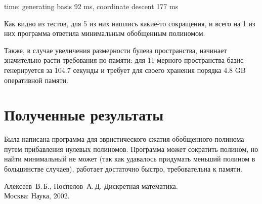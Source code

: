 \documentclass[a4paper,12pt,titlepage,finall]{article}
\begin{document}
time: generating basis 92 ms, coordinate descent 177 ms

Как видно из тестов, для 5 из них нашлись какие-то сокращения, и всего на 1 из них программа ответила минимальным обобщенным полиномом.

Также, в случае увеличения размерности булева пространства, начинает значительно расти требования по памяти: для 11-мерного пространства базис генерируется за 104.7 секунды и требует для своего хранения порядка 4.8 GB оперативной памяти.

\section{Полученные результаты}

Была написана программа для эвристического сжатия обобщенного полинома путем прибавления нулевых полиномов. Программа может сократить полином, но найти минимальный не может (так как удавалось придумать меньший полином в большинстве случаев), работает достаточно быстро, требовательна к памяти.

\begin{raggedright}
\begin{thebibliography}{99}
 Алексеев~В.\,Б., Поспелов~А.\,Д. Дискретная математика.\\Москва: Наука, 2002.
\end{thebibliography}
\end{raggedright}
\end{document}
